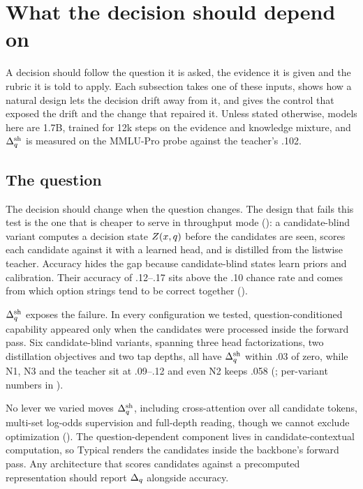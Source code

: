 \section{What the decision should depend on}
\label{sec:depends}
\label{sec:analysis}

A decision should follow the question it is asked, the evidence it is given and the rubric it is told to
apply. Each subsection takes one of these inputs, shows how a natural design lets the decision drift away
from it, and gives the control that exposed the drift and the change that repaired it. Unless stated
otherwise, models here are 1.7B, trained for 12k steps on the evidence and knowledge mixture, and
$\Delta_q^{\mathrm{sh}}$ is measured on the MMLU-Pro probe against the teacher's .102.

\subsection{The question}
\label{sec:analysis:deltaq}

The decision should change when the question changes. The design that fails this test is the one that is
cheaper to serve in throughput mode (): a candidate-blind variant computes a
decision state $Z(x, q)$ before the candidates are seen, scores each candidate against it with
a learned head, and is distilled from the listwise teacher. Accuracy hides the gap because
candidate-blind states learn priors and calibration. Their accuracy of
.12--.17 sits above the .10 chance rate and comes from which option strings tend to be correct together ().

$\Delta_q^{\mathrm{sh}}$ exposes the failure. In every configuration we tested, question-conditioned capability appeared
only when the candidates were processed inside the forward pass. Six candidate-blind variants, spanning
three head factorizations, two distillation objectives and two tap depths, all have $\Delta_q^{\mathrm{sh}}$ within .03
of zero, while N1, N3 and the teacher sit at .09--.12 and even N2 keeps .058 (;
per-variant numbers in ).

No lever we varied moves $\Delta_q^{\mathrm{sh}}$, including cross-attention over all candidate tokens, multi-set
log-odds supervision and full-depth reading, though we cannot exclude optimization
(). The question-dependent component lives in candidate-contextual computation, so Typical renders the candidates inside the backbone's
forward pass. Any architecture that scores candidates against a precomputed representation should report
$\Delta_q$ alongside accuracy.

